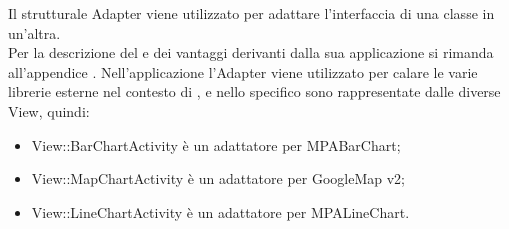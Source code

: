 	Il  strutturale Adapter viene utilizzato per adattare l'interfaccia di una classe in un'altra.\\
	Per la descrizione del  e dei vantaggi derivanti dalla sua applicazione si rimanda all'appendice .
	Nell'applicazione  l'Adapter viene utilizzato per calare le varie librerie esterne nel contesto di \projectname{}, e nello specifico sono rappresentate dalle diverse View, quindi:
	\begin{itemize}
	\item View::BarChartActivity è un adattatore per MPABarChart;
	\item View::MapChartActivity è un adattatore per GoogleMap   v2;
	\item View::LineChartActivity è un adattatore per MPALineChart.
	\end{itemize}
